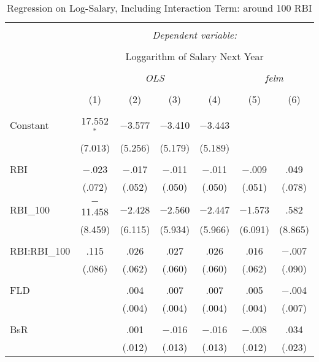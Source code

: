 
\begin{table}[H] \centering
  \caption{Regression on Log-Salary, Including Interaction Term: around 100 RBI}
  \label{RBI100_A}
\tiny
\begin{tabular}{@{\extracolsep{5pt}}lcccccc}
\\[-1.8ex]\hline
\hline \\[-1.8ex]
 & \multicolumn{6}{c}{\textit{Dependent variable:}} \\
\cline{2-7}
\\[-1.8ex] & \multicolumn{6}{c}{Loggarithm of Salary Next Year} \\
\\[-1.8ex] & \multicolumn{4}{c}{\textit{OLS}} & \multicolumn{2}{c}{\textit{felm}} \\
\\[-1.8ex] & (1) & (2) & (3) & (4) & (5) & (6)\\
\hline \\[-1.8ex]
 Constant & 17.552$^{*}$ & $-$3.577 & $-$3.410 & $-$3.443 &  &  \\
  & (7.013) & (5.256) & (5.179) & (5.189) &  &  \\
  & & & & & & \\
 RBI & $-$.023 & $-$.017 & $-$.011 & $-$.011 & $-$.009 & .049 \\
  & (.072) & (.052) & (.050) & (.050) & (.051) & (.078) \\
  & & & & & & \\
 RBI\_100 & $-$11.458 & $-$2.428 & $-$2.560 & $-$2.447 & $-$1.573 & .582 \\
  & (8.459) & (6.115) & (5.934) & (5.966) & (6.091) & (8.865) \\
  & & & & & & \\
  RBI:RBI\_100 & .115 & .026 & .027 & .026 & .016 & $-$.007 \\
  & (.086) & (.062) & (.060) & (.060) & (.062) & (.090) \\
  & & & & & & \\
 FLD &  & .004 & .007 & .007 & .005 & $-$.004 \\
  &  & (.004) & (.004) & (.004) & (.004) & (.007) \\
  & & & & & & \\
 BsR &  & .001 & $-$.016 & $-$.016 & $-$.008 & .034 \\
  &  & (.012) & (.013) & (.013) & (.012) & (.023) \\

\end{tabular}
\end{table}
